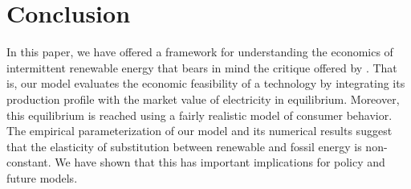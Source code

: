 \documentclass[11pt,a4paper]{extarticle}
\begin{document}










\section{Conclusion}


In this paper, we have offered a framework for understanding the economics of intermittent renewable energy that bears in mind the critique offered by \citet{Joskow2011}. That is, our model evaluates the economic feasibility of a technology by integrating its production profile with the market value of electricity in equilibrium. Moreover, this equilibrium is reached using a fairly realistic model of consumer behavior. The empirical parameterization of our model and its numerical results suggest that the elasticity of substitution between renewable and fossil energy is non-constant. We have shown that this has important implications for policy and future models. 
\end{document}
